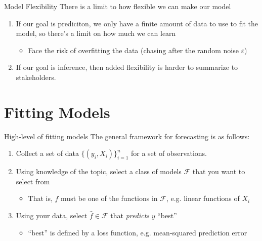 \documentclass[aspectratio=169,t,11pt,table]{beamer}
\begin{document}

\begin{frame}{Model Flexibility}
  There is a limit to how \alert{flexible} we can make our model
 
  \bigskip
  \begin{enumerate}
    \item If our goal is prediciton, we only have a finite amount of data to use to fit the model, so there's a limit on how much we can learn
    \begin{itemize}
      \item Face the risk of \alert{overfitting} the data (chasing after the random noise $\varepsilon$)
    \end{itemize}
   
    \bigskip
    \item If our goal is inference, then added flexibility is harder to summarize to stakeholders.
  \end{enumerate}
\end{frame}


\section{Fitting Models}

\begin{frame}{High-level of fitting models}
  The general framework for forecasting is as follows:
  \begin{enumerate}
    \item Collect a set of data $\{ (y_i, X_i) \}_{i=1}^n$ for a set of observations.
    
    \bigskip
    \item Using knowledge of the topic, select a \alert{class} of models $\mathcal{F}$ that you want to select from
    \begin{itemize}
      \item That is, $\hat{f}$ must be one of the functions in $\mathcal{F}$, e.g. linear functions of $X_i$
    \end{itemize}
    
    \bigskip
    \item Using your data, select $\hat{f} \in \mathcal{F}$ that \emph{predicts} $y$ ``best''
    \begin{itemize}
      \item ``best'' is defined by a \alert{loss function}, e.g. mean-squared prediction error
    \end{itemize}
  \end{enumerate}
\end{frame}
\end{document}
